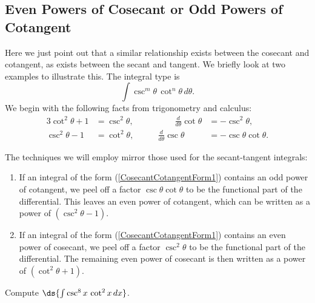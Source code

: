 \subsection{Even Powers of Cosecant or Odd Powers of Cotangent
\label{EvenCosecant/OddCotangent}}

Here we just point out that a similar relationship 
exists between the cosecant and cotangent, as exists
between the secant and tangent.  We briefly look
at two examples to illustrate this.   The integral type
is 
\begin{equation}
\int\csc^m\theta\,\cot^n\theta\,d\theta.\label{CosecantCotangentForm1}
\end{equation}
We begin with  the following facts from trigonometry and calculus:
\begin{alignat*}{3}
\cot^2\theta+1&=\csc^2\theta,&\qquad\qquad
            \frac{d}{d\theta}\cot\theta&=-\csc^2\theta,\\
\csc^2\theta-1&=\cot^2\theta,&\qquad\frac{d}{d\theta}
        \csc\theta&=-\csc\theta\cot\theta.\end{alignat*}

The techniques we will employ mirror those used for
the secant-tangent integrals:
\begin{enumerate}
\item If an integral of the form (\ref{CosecantCotangentForm1})
contains an odd power of cotangent, we peel off a factor
$\csc\theta\cot\theta$ to be the functional part of the differential.
This leaves an even power of cotangent, which can be written as
a power of $\left(\csc^2\theta-1\right)$.
\item If an integral of the form (\ref{CosecantCotangentForm1})
contains an even power of cosecant, we peel off a factor
$\csc^2\theta$ to be the functional part of the differential.
The remaining even power of cosecant is then written as 
a power of $\left(\cot^2\theta+1\right)$.
\end{enumerate}

\bex Compute $\ds{\int\csc^8x\,\cot^2x\,dx}$.

